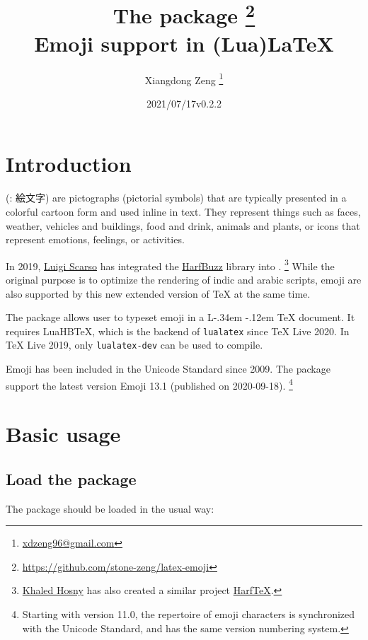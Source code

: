 \documentclass{l3doc}
\title{The \pkg{emoji} package \thanks{\url{https://github.com/stone-zeng/latex-emoji}} \\
  Emoji support in (Lua)\LaTeX}
\author{Xiangdong Zeng \thanks{\url{xdzeng96@gmail.com}}}
\date{\emoji{date} 2021/07/17\quad v0.2.2}
\DeclareRobustCommand{\LaTeX}{
  L\kern-.34em
  \raisebox{.36ex}{\scalebox{0.9}{\textsc{a}}}
  \kern-.12em
  \TeX}
\newcounter { emoji }
\def\LuaHBTeX{LuaHB\TeX}
\begin{document}
\maketitle

\tableofcontents

\section{ Introduction}

 (: {\fontja 絵文字}) are pictographs (pictorial symbols) that are
typically presented in a colorful cartoon form and used inline in text. They represent things
such as faces, weather, vehicles and buildings, food and drink, animals and plants, or icons
that represent emotions, feelings, or activities.\textsuperscript{\cite{utr51}}

In 2019, \href{https://github.com/luigiScarso}{Luigi Scarso} has integrated the
\href{https://github.com/harfbuzz/harfbuzz}{HarfBuzz} library into \LuaTeX.%
\footnote{\href{https://github.com/khaledhosny}{Khaled Hosny} has also created a similar project
  \href{https://github.com/khaledhosny/harftex}{HarfTeX}.}
While the original purpose is to optimize the rendering of indic and arabic scripts, emoji are
also supported by this new extended version of \TeX{} at the same time.

The  package allows user to typeset emoji in a \LaTeX{} document. It requires
\LuaHBTeX{}, which is the backend of \texttt{lualatex} since \TeX{} Live 2020. In \TeX{} Live
2019, only \texttt{lualatex-dev} can be used to compile.

Emoji has been included in the Unicode Standard since 2009. The  package support
the latest version Emoji 13.1 (published on 2020-09-18).%
\footnote{Starting with version 11.0, the repertoire of emoji characters is synchronized with
  the Unicode Standard, and has the same version numbering system.}

\section{ Basic usage}

\subsection{ Load the package}

The package should be loaded in the usual way:
\end{document}

